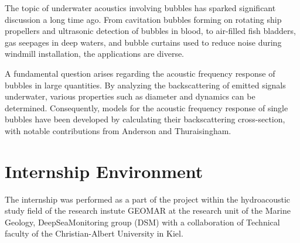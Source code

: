 


The topic of underwater acoustics involving bubbles has sparked significant discussion a long time ago. From cavitation bubbles forming on rotating ship propellers and ultrasonic detection of bubbles in blood, to air-filled fish bladders, gas seepages in deep waters, and bubble curtains used to reduce noise during windmill installation, the applications are diverse.

A fundamental question arises regarding the acoustic frequency response of bubbles in large quantities. By analyzing the backscattering of emitted signals underwater, various properties such as diameter and dynamics can be determined. Consequently, models for the acoustic frequency response of single bubbles have been developed by calculating their backscattering cross-section, with notable contributions from Anderson and Thuraisingham.

\section{Internship Environment}
The internship was performed as a part of the project within the hydroacoustic study field of the research instute GEOMAR at the research unit of the Marine Geology, DeepSeaMonitoring group (DSM) with a collaboration of Technical faculty of the Christian-Albert University in Kiel. 

